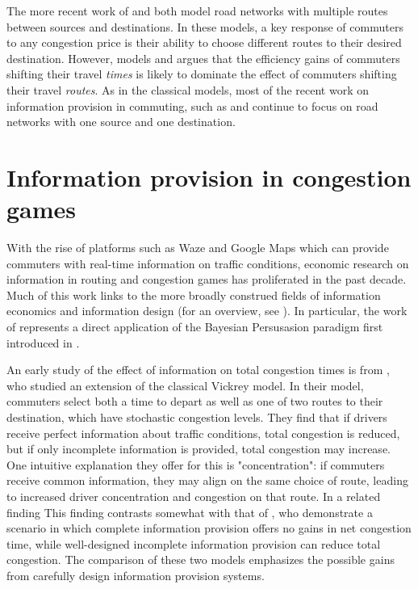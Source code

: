 \documentclass[JEL]{AEA}
\begin{document}
The more recent work of \cite{das-2017} and \cite{ostrovsky-2018} both model road networks with multiple routes between sources and destinations. In these models, a key response of commuters to any congestion price is their ability to choose different routes to their desired destination. However, \cite{arnott-1990} models and argues that the efficiency gains of commuters shifting their travel \emph{times} is likely to dominate the effect of commuters shifting their travel \emph{routes}. As in the classical models, most of the recent work on information provision in commuting, such as \cite{das-2017} and \cite{acemoglu-2016} continue to focus on road networks with one source and one destination.

\section{Information provision in congestion games}
\label{information-provision}

With the rise of platforms such as Waze and Google Maps which can provide commuters with real-time information on traffic conditions, economic research on information in routing and congestion games has proliferated in the past decade. Much of this work links to the more broadly construed fields of information economics and information design (for an overview, see \cite{bergemann-2019}). In particular, the work of \cite{das-2017} represents a direct application of the Bayesian Persusasion paradigm first introduced in \cite{kamenica-2011}.

An early study of the effect of information on total congestion times is from \cite{arnott-1991}, who studied an extension of the classical Vickrey model. In their model, commuters select both a time to depart as well as one of two routes to their destination, which have stochastic congestion levels. They find that if drivers receive perfect information about traffic conditions, total congestion is reduced, but if only incomplete information is provided, total congestion may increase. One intuitive explanation they offer for this is "concentration": if commuters receive common information, they may align on the same choice of route, leading to increased driver concentration and congestion on that route. In a related finding This finding contrasts somewhat with that of \cite{das-2017}, who demonstrate a scenario in which complete information provision offers no gains in net congestion time, while well-designed incomplete information provision can reduce total congestion. The comparison of these two models emphasizes the possible gains from carefully design information provision systems.
\end{document}
